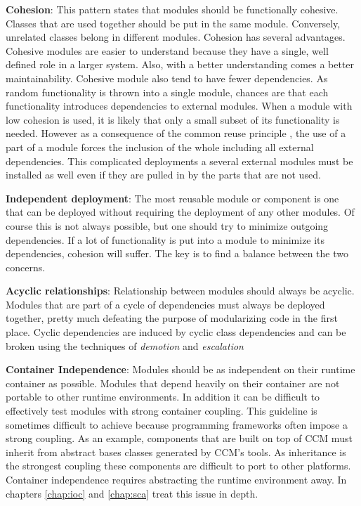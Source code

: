 \textbf{Cohesion}:
This pattern states that modules should be functionally cohesive. Classes that are used together should
be put in the same module. Conversely, unrelated classes belong in different modules. Cohesion has several
advantages. Cohesive modules are easier to understand because they have a single, well defined role in a
larger system. Also, with a better understanding comes a better maintainability. Cohesive module also tend
to have fewer dependencies. As random functionality is thrown into a single module, chances are that each
functionality introduces dependencies to external modules. When a module with low cohesion is used, it is
likely that only a small subset of its functionality is needed. However as a consequence of the common reuse
principle \cite{Martin}, the use of a part of a module forces the inclusion of the whole including all
external dependencies. This complicated deployments a several external modules must be installed as well
even if they are pulled in by the parts that are not used.

\textbf{Independent deployment}:
The most reusable module or component is one that can be deployed without requiring the deployment of any other
modules. Of course this is not always possible, but one should try to minimize outgoing dependencies.
If a lot of functionality is put into a module to minimize its dependencies, cohesion will suffer.
The key is to find a balance between the two concerns.

\textbf{Acyclic relationships}:
Relationship between modules should always be acyclic. Modules that are part of a cycle of dependencies
must always be deployed together, pretty much defeating the purpose of modularizing code in the first place.
Cyclic dependencies are induced by cyclic class dependencies and can be broken using the techniques of
\emph{demotion} and \emph{escalation} \cite{Lakos}

\textbf{Container Independence}:
Modules should be as independent on their runtime container as possible. Modules that depend heavily on their
container are not portable to other runtime environments. In addition it can be difficult to effectively
test modules with strong container coupling. This guideline is sometimes difficult to achieve because
programming frameworks often impose a strong coupling. As an example, components that are built on top
of CCM must inherit from abstract bases classes generated by CCM's tools. As inheritance is the strongest coupling
these components are difficult to port to other platforms. Container independence requires abstracting the
runtime environment away. In chapters \ref{chap:ioc} and \ref{chap:sca} treat this issue in depth.

